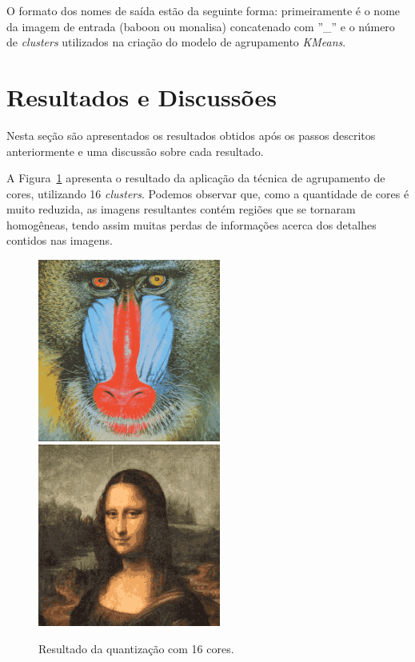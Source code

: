 \documentclass[twoside,twocolumn]{article}
\begin{document}
O formato dos nomes de saída estão da seguinte forma: primeiramente é o nome da imagem de entrada (baboon ou monalisa) concatenado com ''\_'' e o número de \textit{clusters} utilizados na criação do modelo de agrupamento \textit{KMeans}.


\section{Resultados e Discussões}

Nesta seção são apresentados os resultados obtidos após os passos descritos anteriormente e uma discussão sobre cada resultado.

A Figura~\ref{quant_16} apresenta o resultado da aplicação da técnica de agrupamento de cores, utilizando 16 \textit{clusters}. Podemos observar que, como a quantidade de cores é muito reduzida, as imagens resultantes contém regiões que se tornaram homogêneas, tendo assim muitas perdas de informações acerca dos detalhes contidos nas imagens.

\begin{figure}[h]
\begin{center}
	\includegraphics[height=6cm]{figures/baboon_16.png}
	\includegraphics[height=6cm]{figures/monalisa_16.png}
\caption{Resultado da quantização com 16 cores.} \label{quant_16}
\end{center}
\end{figure}
\end{document}
